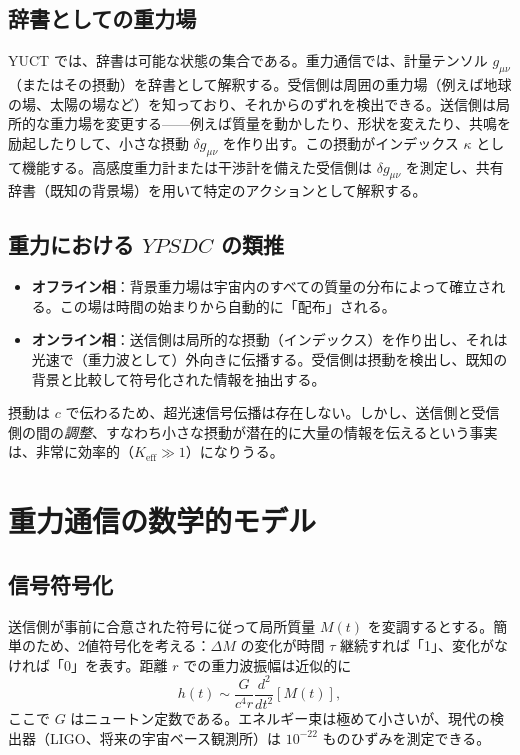 \documentclass[12pt,a4paper]{article}
\newcommand{\Keff}{K_{\mathrm{eff}}}
\newcommand{\YPSDC}{YPSDC}
\begin{document}
	\subsection{辞書としての重力場}
	
	YUCT では、辞書は可能な状態の集合である。重力通信では、計量テンソル \(g_{\mu\nu}\)（またはその摂動）を辞書として解釈する。受信側は周囲の重力場（例えば地球の場、太陽の場など）を知っており、それからのずれを検出できる。送信側は局所的な重力場を変更する——例えば質量を動かしたり、形状を変えたり、共鳴を励起したりして、小さな摂動 \(\delta g_{\mu\nu}\) を作り出す。この摂動がインデックス \(\kappa\) として機能する。高感度重力計または干渉計を備えた受信側は \(\delta g_{\mu\nu}\) を測定し、共有辞書（既知の背景場）を用いて特定のアクションとして解釈する。
	
	\subsection{重力における \(\YPSDC\) の類推}
	
	\begin{itemize}
		\item \textbf{オフライン相}：背景重力場は宇宙内のすべての質量の分布によって確立される。この場は時間の始まりから自動的に「配布」される。
		\item \textbf{オンライン相}：送信側は局所的な摂動（インデックス）を作り出し、それは光速で（重力波として）外向きに伝播する。受信側は摂動を検出し、既知の背景と比較して符号化された情報を抽出する。
	\end{itemize}
	
	摂動は \(c\) で伝わるため、超光速信号伝播は存在しない。しかし、送信側と受信側の間の\emph{調整}、すなわち小さな摂動が潜在的に大量の情報を伝えるという事実は、非常に効率的（\(\Keff \gg 1\)）になりうる。
	
	\section{重力通信の数学的モデル}
	\label{sec:model}
	
	\subsection{信号符号化}
	
	送信側が事前に合意された符号に従って局所質量 \(M(t)\) を変調するとする。簡単のため、2値符号化を考える：\(\Delta M\) の変化が時間 \(\tau\) 継続すれば「1」、変化がなければ「0」を表す。距離 \(r\) での重力波振幅は近似的に
	\begin{equation}
		h(t) \sim \frac{G}{c^4 r} \frac{d^2}{dt^2} \left[ M(t) \right],
	\end{equation}
	ここで \(G\) はニュートン定数である。エネルギー束は極めて小さいが、現代の検出器（LIGO、将来の宇宙ベース観測所）は \(10^{-22}\) ものひずみを測定できる。
	
\end{document}

